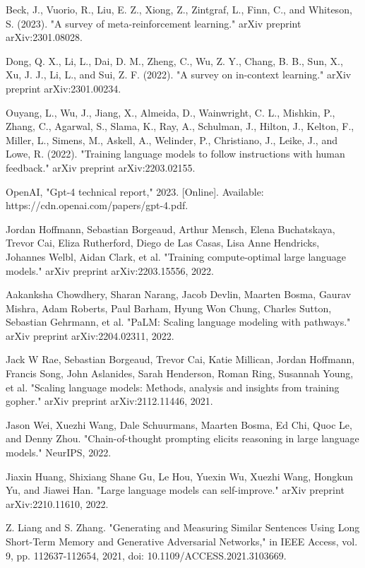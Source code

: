 \documentclass[conference]{IEEEtran}
\begin{document}
\begin{thebibliography}{00}
 Beck, J., Vuorio, R., Liu, E. Z., Xiong, Z., Zintgraf, L., Finn, C., and Whiteson, S. (2023). "A survey of meta-reinforcement learning." arXiv preprint arXiv:2301.08028.

 Dong, Q. X., Li, L., Dai, D. M., Zheng, C., Wu, Z. Y., Chang, B. B., Sun, X., Xu, J. J., Li, L., and Sui, Z. F. (2022). "A survey on in-context learning." arXiv preprint arXiv:2301.00234.

 Ouyang, L., Wu, J., Jiang, X., Almeida, D., Wainwright, C. L., Mishkin, P., Zhang, C., Agarwal, S., Slama, K., Ray, A., Schulman, J., Hilton, J., Kelton, F., Miller, L., Simens, M., Askell, A., Welinder, P., Christiano, J., Leike, J., and Lowe, R. (2022). "Training language models to follow instructions with human feedback." arXiv preprint arXiv:2203.02155.

 OpenAI, "Gpt-4 technical report," 2023. [Online]. Available: https://cdn.openai.com/papers/gpt-4.pdf.

 Jordan Hoffmann, Sebastian Borgeaud, Arthur Mensch, Elena Buchatskaya, Trevor Cai, Eliza Rutherford, Diego de Las Casas, Lisa Anne Hendricks, Johannes Welbl, Aidan Clark, et al. "Training compute-optimal large language models." arXiv preprint arXiv:2203.15556, 2022.

 Aakanksha Chowdhery, Sharan Narang, Jacob Devlin, Maarten Bosma, Gaurav Mishra, Adam Roberts, Paul Barham, Hyung Won Chung, Charles Sutton, Sebastian Gehrmann, et al. "PaLM: Scaling language modeling with pathways." arXiv preprint arXiv:2204.02311, 2022.

 Jack W Rae, Sebastian Borgeaud, Trevor Cai, Katie Millican, Jordan Hoffmann, Francis Song, John Aslanides, Sarah Henderson, Roman Ring, Susannah Young, et al. "Scaling language models: Methods, analysis and insights from training gopher." arXiv preprint arXiv:2112.11446, 2021.

 Jason Wei, Xuezhi Wang, Dale Schuurmans, Maarten Bosma, Ed Chi, Quoc Le, and Denny Zhou. "Chain-of-thought prompting elicits reasoning in large language models." NeurIPS, 2022.

 Jiaxin Huang, Shixiang Shane Gu, Le Hou, Yuexin Wu, Xuezhi Wang, Hongkun Yu, and Jiawei Han. "Large language models can self-improve." arXiv preprint arXiv:2210.11610, 2022.

 Z. Liang and S. Zhang. "Generating and Measuring Similar Sentences Using Long Short-Term Memory and Generative Adversarial Networks," in IEEE Access, vol. 9, pp. 112637-112654, 2021, doi: 10.1109/ACCESS.2021.3103669.


\end{thebibliography}
\end{document}
